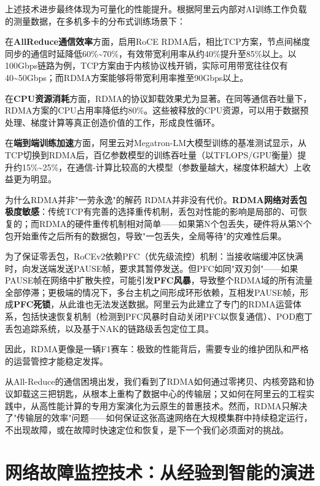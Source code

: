 上述技术进步最终体现为可量化的性能提升。根据阿里云内部对AI训练工作负载的测量数据，在多机多卡的分布式训练场景下：

在\textbf{AllReduce通信效率}方面，启用RoCE RDMA后，相比TCP方案，节点间梯度同步的通信时延降低60\%\textasciitilde70\%，有效带宽利用率从约40\%提升至85\%以上。以100Gbps链路为例，TCP方案由于内核协议栈开销，实际可用带宽往往仅有40\textasciitilde50Gbps；而RDMA方案能够将带宽利用率推至90Gbps以上。

在\textbf{CPU资源消耗}方面，RDMA的协议卸载效果尤为显著。在同等通信吞吐量下，RDMA方案的CPU占用率降低约80\%。这些被释放的CPU资源，可以用于数据预处理、梯度计算等真正创造价值的工作，形成良性循环。

在\textbf{端到端训练加速}方面，阿里云对Megatron-LM大模型训练的基准测试显示，从TCP切换到RDMA后，百亿参数模型的训练吞吐量（以TFLOPS/GPU衡量）提升约15\%\textasciitilde25\%，在通信-计算比较高的大模型（参数量越大，梯度体积越大）上收益更为明显。

\begin{insightbox}{为什么RDMA并非"一劳永逸"的解药}
RDMA并非没有代价。\textbf{RDMA网络对丢包极度敏感}：传统TCP有完善的选择重传机制，丢包对性能的影响是局部的、可恢复的；而RDMA的硬件重传机制相对简单——如果第N个包丢失，硬件将从第N个包开始重传之后所有的数据包，导致"一包丢失，全局等待"的灾难性后果。

为了保证零丢包，RoCEv2依赖PFC（优先级流控）机制：当接收端缓冲区快满时，向发送端发送PAUSE帧，要求其暂停发送。但PFC如同"双刃剑"——如果PAUSE帧在网络中扩散失控，可能引发\textbf{PFC风暴}，导致整个RDMA域的所有流量全部停滞；更极端的情况下，多台主机之间形成环形依赖，互相发PAUSE帧，形成\textbf{PFC死锁}，从此谁也无法发送数据。阿里云为此建立了专门的RDMA运营体系，包括快速恢复机制（检测到PFC风暴时自动关闭PFC以恢复通信）、POD庖丁丢包追踪系统，以及基于NAK的链路级丢包定位工具。

因此，RDMA更像是一辆F1赛车：极致的性能背后，需要专业的维护团队和严格的运营管控才能稳定发挥。
\end{insightbox}

从All-Reduce的通信困境出发，我们看到了RDMA如何通过零拷贝、内核旁路和协议卸载这三把钥匙，从根本上重构了数据中心的传输层；又如何在阿里云的工程实践中，从高性能计算的专用方案演化为云原生的普惠技术。然而，RDMA只解决了"传输层的效率"问题——如何保证这张高速网络在大规模集群中持续稳定运行，不出现故障，或在故障时快速定位和恢复，是下一个我们必须面对的挑战。

\section{网络故障监控技术：从经验到智能的演进}

